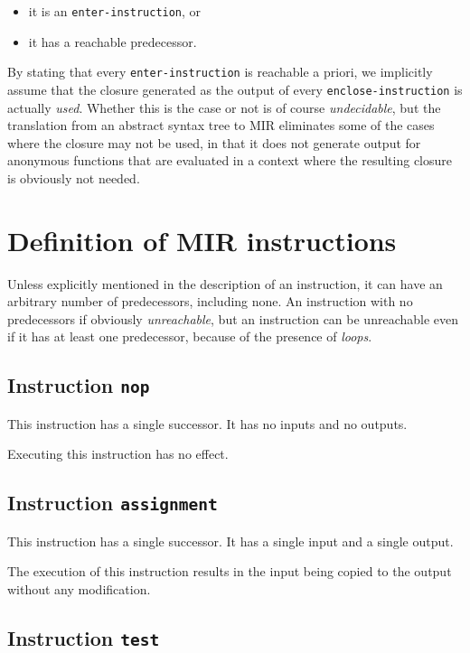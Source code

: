 \begin{itemize}
\item it is an \texttt{enter-instruction}, or
\item it has a reachable predecessor.
\end{itemize}

By stating that every \texttt{enter-instruction} is reachable a
priori, we implicitly assume that the closure generated as the output
of every \texttt{enclose-instruction} is actually \emph{used}.
Whether this is the case or not is of course \emph{undecidable}, but
the translation from an abstract syntax tree to MIR eliminates some of
the cases where the closure may not be used, in that it does not
generate output for anonymous functions that are evaluated in a
context where the resulting closure is obviously not needed.

\section{Definition of MIR instructions}
\label{sec-mir-instructions}

Unless explicitly mentioned in the description of an instruction, it
can have an arbitrary number of predecessors, including none.  An
instruction with no predecessors if obviously \emph{unreachable}, but
an instruction can be unreachable even if it has at least one
predecessor, because of the presence of \emph{loops}. 

\subsection{Instruction \texttt{nop}}
\label{mir-instruction-NOP}

This instruction has a single successor.  It has no inputs and no
outputs.

Executing this instruction has no effect. 

\subsection{Instruction \texttt{assignment}}
\label{mir-instruction-assignment}

This instruction has a single successor.  It has a single input and a
single output. 

The execution of this instruction results in the input being copied to
the output without any modification. 

\subsection{Instruction \texttt{test}}
\label{mir-instruction-test}

